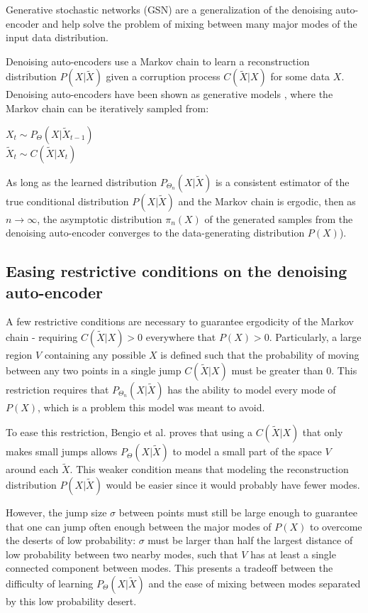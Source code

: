 Generative stochastic networks (GSN) are a generalization of the denoising auto-encoder and help solve the problem of mixing between many major modes of the input data distribution.

Denoising auto-encoders use a Markov chain to learn a reconstruction distribution \(P(X|\widetilde{X})\) given a corruption process \(C(\widetilde{X}|X)\) for some data \(X\). Denoising auto-encoders have been shown as generative models \cite{bengio13a}, where the Markov chain can be iteratively sampled from:

 \(X_t \sim P_\Theta(X|\widetilde{X}_{t-1})\)\\
 \(\widetilde{X}_t \sim C(\widetilde{X}|X_t)\)

As long as the learned distribution \(P_{\Theta_n}(X|\widetilde{X})\) is a consistent estimator of the true conditional distribution \(P(X|\widetilde{X})\) and the Markov chain is ergodic, then as \(n \rightarrow \infty\), the asymptotic distribution \(\pi_n(X)\) of the generated samples from the denoising auto-encoder converges to the data-generating distribution \(P(X)\)\cite{bengio13a}). 


\subsection{Easing restrictive conditions on the denoising auto-encoder}

A few restrictive conditions are necessary to guarantee ergodicity of the Markov chain - requiring \(C(\widetilde{X}|X) > 0\) everywhere that \(P(X) > 0\). Particularly, a large region \(V\) containing any possible \(X\) is defined such that the probability of moving between any two points in a single jump \(C(\widetilde{X}|X)\) must be greater than 0. This restriction requires that \(P_{\Theta_n}(X|\widetilde{X})\) has the ability to model every mode of \(P(X)\), which is a problem this model was meant to avoid.

To ease this restriction, Bengio et al. \cite{gsn} proves that using a \(C(\widetilde{X}|X)\) that only makes small jumps allows \(P_{\Theta}(X|\widetilde{X})\) to model a small part of the space \(V\) around each \(\widetilde{X}\). This weaker condition means that modeling the reconstruction distribution \(P(X|\widetilde{X})\) would be easier since it would probably have fewer modes. 

However, the jump size \(\sigma\) between points must still be large enough to guarantee that one can jump often enough between the major modes of \(P(X)\) to overcome the deserts of low probability: \(\sigma\) must be larger than half the largest distance of low probability between two nearby modes, such that \(V\) has at least a single connected component between modes. This presents a tradeoff between the difficulty of learning \(P_{\Theta}(X|\widetilde{X})\) and the ease of mixing between modes separated by this low probability desert.


